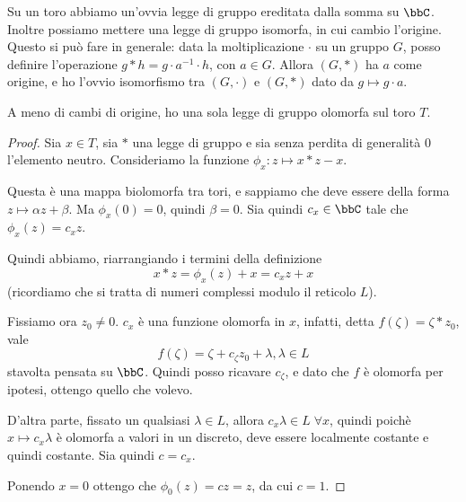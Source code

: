 	Su un toro abbiamo un'ovvia legge di gruppo ereditata dalla somma su $\bbC$. Inoltre possiamo mettere una legge di gruppo isomorfa, in cui cambio l'origine. Questo si può fare in generale: data la moltiplicazione $\cdot$ su un gruppo $G$, posso definire l'operazione $g * h = g\cdot a^{-1}\cdot h$, con $a\in G$. Allora $(G,*)$ ha $a$ come origine, e ho l'ovvio isomorfismo tra $(G,\cdot)$ e $(G,*)$ dato da $g\mapsto g\cdot a$.
	
	\begin{proposizione}
		A meno di cambi di origine, ho una sola legge di gruppo olomorfa sul toro $T$.
	\end{proposizione}
	
	\begin{proof}
		Sia $x \in T$, sia $*$ una legge di gruppo e sia senza perdita di generalità $0$ l'elemento neutro. Consideriamo la funzione $\phi_x: z \mapsto x * z - x$.

		Questa è una mappa biolomorfa tra tori, e sappiamo che deve essere della forma $z \mapsto \alpha z + \beta$. Ma $\phi_x(0)=0$, quindi $\beta=0$. Sia quindi $c_x \in \bbC$ tale che $\phi_x(z)=c_xz$.
		
		Quindi abbiamo, riarrangiando i termini della definizione 
		\[
		 x*z = \phi_x(z) + x = c_xz + x
		\]
		(ricordiamo che si tratta di numeri complessi modulo il reticolo $L$).
		
		Fissiamo ora $z_0\ne 0$. $c_x$ è una funzione olomorfa in $x$, infatti, detta $f(\zeta) = \zeta * z_0$, vale
		\[
			f(\zeta) = \zeta + c_\zeta z_0 + \lambda, \lambda \in L
		\]
		stavolta pensata su $\bbC$. Quindi posso ricavare $c_\zeta$, e dato che $f$ è olomorfa per ipotesi, ottengo quello che volevo.
		
		D'altra parte, fissato un qualsiasi $\lambda \in L$, allora $c_x\lambda \in L \; \forall x$, quindi poichè $x \mapsto c_x \lambda$ è olomorfa a valori in un discreto, deve essere localmente costante e quindi costante. Sia quindi $c=c_x$.
		
		Ponendo $x=0$ ottengo che $\phi_0(z) = cz = z$, da cui $c=1$.


	\end{proof}



	
	

